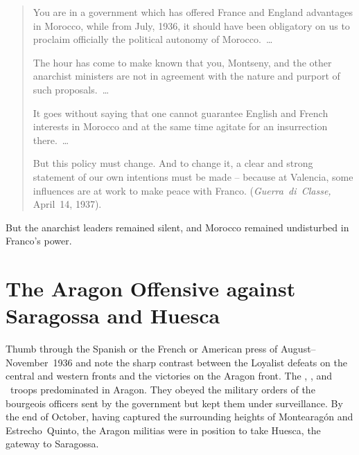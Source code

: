 \indexCNT{}
\begin{quotation}
  You are in a government which has offered France and England advantages in Morocco, while from July, 1936, it should have been obligatory on us to proclaim officially the political autonomy of Morocco.\ \dots
  
  The hour has come to make known that you, Montseny, and the other anarchist ministers are not in agreement with the nature and purport of such proposals.\ \dots
  
  It goes without saying that one cannot guarantee English and French interests in Morocco and at the same time agitate for an insurrection there.\ \dots
  
  But this policy must change. And to change it, a clear and strong statement of our own intentions must be made -- because at Valencia, some influences are at work to make peace with Franco. (\emph{Guerra~di~Classe,} April~14, 1937). 
\end{quotation}

But the anarchist leaders remained silent, and Morocco remained undisturbed in Franco’s power.%

\section{The Aragon Offensive against Saragossa and Huesca}

Thumb through the Spanish or the French or American press of August--November~1936 and note the sharp contrast between the Loyalist defeats on the central and western fronts and the victories on the Aragon front. The \CNT, \FAI, and \POUM\ troops predominated in Aragon. They obeyed the military orders of the bourgeois officers sent by the government but kept them under surveillance. By the end of October, having captured the surrounding heights of Montearagón and Estrecho~Quinto, the Aragon militias were in position to take Huesca, the gateway to Saragossa.

